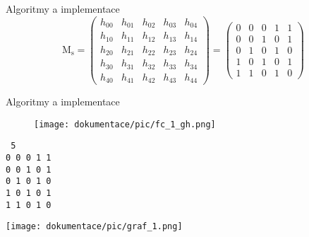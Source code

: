 \documentclass[xcolor=dvipsnames,table,10pt]{beamer}
\begin{document}
\begin{frame}{Algoritmy a implementace}
    \begin{equation} \label{eq:adj-mat}
        \mathrm{M_s} = 
        \begin{pmatrix}
            h_{00} & h_{01} & h_{02} & h_{03} & h_{04} \\
            h_{10} & h_{11} & h_{12} & h_{13} & h_{14} \\
            h_{20} & h_{21} & h_{22} & h_{23} & h_{24} \\
            h_{30} & h_{31} & h_{32} & h_{33} & h_{34} \\
            h_{40} & h_{41} & h_{42} & h_{43} & h_{44}
        \end{pmatrix} = 
        \begin{pmatrix}
            0 & 0 & 0 & 1 & 1 \\
            0 & 0 & 1 & 0 & 1 \\
            0 & 1 & 0 & 1 & 0 \\
            1 & 0 & 1 & 0 & 1 \\
            1 & 1 & 0 & 1 & 0
        \end{pmatrix}
    \end{equation}
\end{frame}

\begin{frame}{Algoritmy a implementace}
    \begin{figure}
        \centering
        \texttt{[image: dokumentace/pic/fc\_1\_gh.png]}
    \end{figure}
    \begin{minipage}{.5\textwidth}
        \centering
        {\setmonofont{}\texttt{
5\\
0 0 0 1 1\\
0 0 1 0 1\\
0 1 0 1 0\\
1 0 1 0 1\\
1 1 0 1 0}}
    \end{minipage}%
    \begin{minipage}{.5\textwidth}
        \centering
        \texttt{[image: dokumentace/pic/graf\_1.png]}
    \end{minipage}
    
\end{frame}
\end{document}
